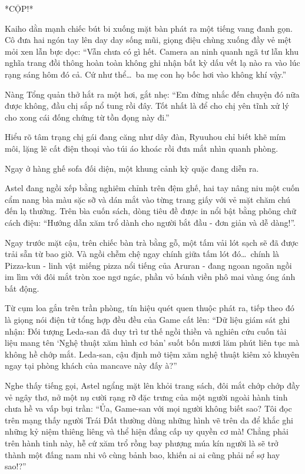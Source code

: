 \documentclass[../main.tex]{subfiles}
\begin{document}
*CỘP!*

Kaiho dằn mạnh chiếc bút bi xuống mặt bàn phát ra một tiếng vang đanh gọn. Cô đưa hai ngón tay lên day day sống mũi, giọng điệu chùng xuống đầy vẻ mệt mỏi xen lẫn bực dọc: ``Vẫn chưa có gì hết. Camera an ninh quanh ngã tư lẫn khu nghĩa trang đồi thông hoàn toàn không ghi nhận bất kỳ dấu vết lạ nào ra vào lúc rạng sáng hôm đó cả. Cứ như thể\dots\ ba mẹ con họ bốc hơi vào không khí vậy.''

Nàng Tổng quản thở hắt ra một hơi, gắt nhẹ: ``Em đừng nhắc đến chuyện đó nữa được không, đầu chị sắp nổ tung rồi đây. Tốt nhất là để cho chị yên tĩnh xử lý cho xong cái đống chứng từ tồn đọng này đi.''

Hiểu rõ tâm trạng chị gái đang căng như dây đàn, Ryuuhou chỉ biết khẽ mím môi, lặng lẽ cất điện thoại vào túi áo khoác rồi đưa mắt nhìn quanh phòng.

Ngay ở hàng ghế sofa đối diện, một khung cảnh kỳ quặc đang diễn ra.

Astel đang ngồi xếp bằng nghiêm chỉnh trên đệm ghế, hai tay nâng niu một cuốn cẩm nang bìa màu sặc sỡ và dán mắt vào từng trang giấy với vẻ mặt chăm chú đến lạ thường. Trên bìa cuốn sách, dòng tiêu đề được in nổi bật bằng phông chữ cách điệu: ``Hướng dẫn xăm trổ dành cho người bắt đầu - đơn giản và dễ dàng!''.

Ngay trước mặt cậu, trên chiếc bàn trà bằng gỗ, một tấm vải lót sạch sẽ đã được trải sẵn từ bao giờ. Và ngồi chễm chệ ngay chính giữa tấm lót đó\dots\ chính là Pizza-kun - linh vật miếng pizza nổi tiếng của Aruran - đang ngoan ngoãn ngồi im lìm với đôi mắt tròn xoe ngơ ngác, phần vỏ bánh viền phô mai vàng óng ánh bất động.


Từ cụm loa gắn trên trần phòng, tín hiệu quét quen thuộc phát ra, tiếp theo đó là giọng nói điện tử tổng hợp đều đều của Game cất lên: ``Dữ liệu giám sát ghi nhận: Đối tượng Leda-san đã duy trì tư thế ngồi thiền và nghiên cứu cuốn tài liệu mang tên `Nghệ thuật xăm hình cơ bản' suốt bốn mươi lăm phút liên tục mà không hề chớp mắt. Leda-san, cậu định mở tiệm xăm nghệ thuật kiêm xỏ khuyên ngay tại phòng khách của mancave này đấy à?''

Nghe thấy tiếng gọi, Astel ngẩng mặt lên khỏi trang sách, đôi mắt chớp chớp đầy vẻ ngây thơ, nở một nụ cười rạng rỡ đặc trưng của một người ngoài hành tinh chưa hề va vấp bụi trần: ``Ủa, Game-san với mọi người không biết sao? Tôi đọc trên mạng thấy người Trái Đất thường dùng những hình vẽ trên da để khắc ghi những kỷ niệm thiêng liêng và thể hiện đẳng cấp uy quyền cơ mà! Chẳng phải trên hành tinh này, hễ cứ xăm trổ rồng bay phượng múa kín người là sẽ trở thành một đấng nam nhi vô cùng bảnh bao, khiến ai ai cũng phải nể sợ hay sao!?''
\end{document}
